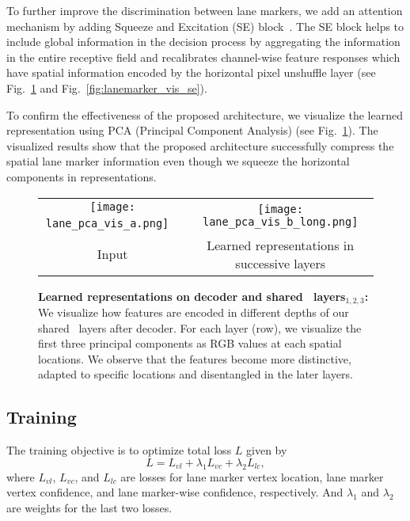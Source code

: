 \documentclass[10pt,twocolumn,letterpaper]{article}
\begin{document}
To further improve the discrimination between lane markers, we add an attention mechanism by adding Squeeze and Excitation (SE) block~\cite{SEBlock}. The SE block helps to include global information in the decision process by aggregating the information in the entire receptive field and recalibrates channel-wise feature responses which have spatial information encoded by the horizontal pixel unshuffle layer (see Fig.~\ref{fig:lanemarker_vis} and Fig.~\ref{fig:lanemarker_vis_se}).

To confirm the effectiveness of the proposed architecture, we visualize the learned representation using PCA (Principal Component Analysis) (see Fig.~\ref{fig:lanemarker_vis}). The visualized results show that the proposed architecture successfully compress the spatial lane marker information even though we squeeze the horizontal components in representations.

\begin{figure}[t]
	\small
	\begin{center}
		\begin{tabular}{@{}c@{}c@{}}
			\texttt{[image: lane\_pca\_vis\_a.png]} \ & \hspace{.5pt}
			\texttt{[image: lane\_pca\_vis\_b\_long.png]} \\
			Input & Learned representations in successive layers
		\end{tabular} 
	\end{center} 
	\caption{\textbf{Learned representations on decoder and shared \reductionname\ layers$_{1,2,3}$:} We visualize how features are encoded in different depths of our shared \reductionname\ layers after decoder. For each layer (row), we visualize the first three principal components as RGB values at each spatial locations. We observe that the features become more distinctive, adapted to specific locations and disentangled in the later layers.}
	\label{fig:lanemarker_vis} 
	\vspace{-5.5px}
\end{figure}

\subsection{Training}
The training objective is to optimize total loss $L$ given by
\begin{equation}
	L = L_{vl} + \lambda_{1} L_{vc} + \lambda_{2} L_{lc},
	\label{eq:loss_all} 
\end{equation}
where $L_{vl}$, $L_{vc}$, and $L_{lc}$ are losses for lane marker vertex location, lane marker vertex confidence, and lane marker-wise confidence, respectively. And $\lambda_{1}$ and  $\lambda_{2}$ are weights for the last two losses. 
\end{document}
